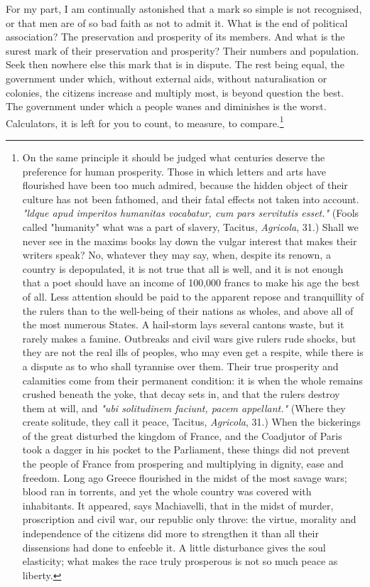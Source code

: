 \documentclass[12pt]{report}
\begin{document}
For my part, I am continually astonished that a mark so simple is not recognised, or that men are of so bad faith as not to admit it. What is the end of political association? The preservation and prosperity of its members. And what is the surest mark of their preservation and prosperity? Their numbers and population. Seek then nowhere else this mark that is in dispute. The rest being equal, the government under which, without external aids, without naturalisation or colonies, the citizens increase and multiply most, is beyond question the best. The government under which a people wanes and diminishes is the worst. Calculators, it is left for you to count, to measure, to compare.\footnote{On the same principle it should be judged what centuries deserve the preference for human prosperity. Those in which letters and arts have flourished have been too much admired, because the hidden object of their culture has not been fathomed, and their fatal effects not taken into account. \textit{"ldque apud imperitos humanitas vocabatur, cum pars servitutis esset."} (Fools called "humanity" what was a part of slavery, Tacitus, \textit{Agricola}, 31.) Shall we never see in the maxims books lay down the vulgar interest that makes their writers speak? No, whatever they may say, when, despite its renown, a country is depopulated, it is not true that all is well, and it is not enough that a poet should have an income of 100,000 francs to make his age the best of all. Less attention should be paid to the apparent repose and tranquillity of the rulers than to the well-being of their nations as wholes, and above all of the most numerous States. A hail-storm lays several cantons waste, but it rarely makes a famine. Outbreaks and civil wars give rulers rude shocks, but they are not the real ills of peoples, who may even get a respite, while there is a dispute as to who shall tyrannise over them. Their true prosperity and calamities come from their permanent condition: it is when the whole remains crushed beneath the yoke, that decay sets in, and that the rulers destroy them at will, and \textit{"ubi solitudinem faciunt, pacem appellant."} (Where they create solitude, they call it peace, Tacitus, \textit{Agricola}, 31.) When the bickerings of the great disturbed the kingdom of France, and the Coadjutor of Paris took a dagger in his pocket to the Parliament, these things did not prevent the people of France from prospering and multiplying in dignity, ease and freedom. Long ago Greece flourished in the midst of the most savage wars; blood ran in torrents, and yet the whole country was covered with inhabitants. It appeared, says Machiavelli, that in the midst of murder, proscription and civil war, our republic only throve: the virtue, morality and independence of the citizens did more to strengthen it than all their dissensions had done to enfeeble it. A little disturbance gives the soul elasticity; what makes the race truly prosperous is not so much peace as liberty.}
\end{document}

